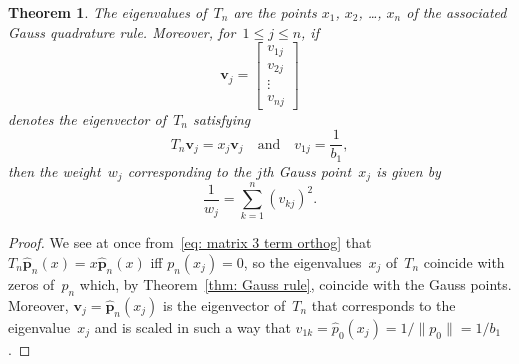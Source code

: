 \documentclass[12pt,a4paper]{article}
\newtheorem{theorem}{Theorem}
\newcommand{\hatvecp}{\hat{\boldsymbol{p}}}
\begin{document}
\begin{theorem}
The eigenvalues of~$T_n$ are the points $x_1$, $x_2$, \dots, $x_n$
of the associated Gauss quadrature rule.  Moreover, for~$1\le j\le n$,
if
\[
\boldsymbol{v}_j=\begin{bmatrix}v_{1j}\\ v_{2j}\\ \vdots\\ v_{nj}
\end{bmatrix}
\]
denotes the eigenvector of~$T_n$ satisfying
\[
T_n\boldsymbol{v}_j=x_j\boldsymbol{v}_j
\quad\text{and}\quad
v_{1j}=\frac{1}{b_1},
\]
then the weight~$w_j$ corresponding to the $j$th Gauss point~$x_j$ 
is given by
\[
\frac{1}{w_j}=\sum_{k=1}^n(v_{kj})^2.
\]
\end{theorem}
\begin{proof}
We see at once from~\eqref{eq: matrix 3 term orthog} that 
$T_n\hatvecp_n(x)=x\hatvecp_n(x)$ iff $p_n(x_j)=0$, so the
eigenvalues~$x_j$ of~$T_n$ coincide with zeros of~$p_n$ which,
by Theorem~\ref{thm: Gauss rule}, coincide with the Gauss points.  
Moreover, $\boldsymbol{v}_j=\hatvecp_n(x_j)$ is the eigenvector 
of~$T_n$ that corresponds to the eigenvalue~$x_j$ and is scaled in 
such a way that $v_{1k}=\hat p_0(x_j)=1/\|p_0\|=1/b_1$.


\end{proof}
\end{document}
